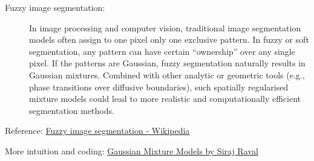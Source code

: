 \begin{description}
    \item[Fuzzy image segmentation:] In image processing and computer vision, traditional image segmentation models often assign to one pixel only one exclusive pattern. In fuzzy or soft segmentation, any pattern can have certain ``ownership'' over any single pixel. If the patterns are Gaussian, fuzzy segmentation naturally results in Gaussian mixtures. Combined with other analytic or geometric tools (e.g., phase transitions over diffusive boundaries), such spatially regularised mixture models could lead to more realistic and computationally efficient segmentation methods.
\end{description}
Reference: \href{https://en.wikipedia.org/wiki/Mixture_model\#Fuzzy_image_segmentation}{Fuzzy image segmentation - Wikipedia}

More intuition and coding: \href{https://youtu.be/JNlEIEwe-Cg}{Gaussian Mixture Models by Siraj Raval}
